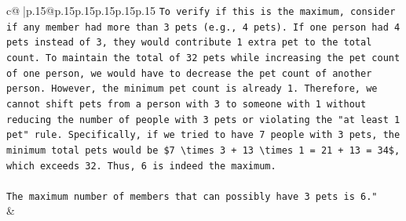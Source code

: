 \documentclass{article}
\begin{document}
{\begin{supertabular}{c@{$\;$}|p{.15\linewidth}@{}p{.15\linewidth}p{.15\linewidth}p{.15\linewidth}p{.15\linewidth}p{.15\linewidth}}
{{{\texttt{To verify if this is the maximum, consider if any member had more than 3 pets (e.g., 4 pets). If one person had 4 pets instead of 3, they would contribute 1 extra pet to the total count. To maintain the total of 32 pets while increasing the pet count of one person, we would have to decrease the pet count of another person. However, the minimum pet count is already 1. Therefore, we cannot shift pets from a person with 3 to someone with 1 without reducing the number of people with 3 pets or violating the "at least 1 pet" rule. Specifically, if we tried to have 7 people with 3 pets, the minimum total pets would be \$7 \textbackslash{}times 3 + 13 \textbackslash{}times 1 = 21 + 13 = 34\$, which exceeds 32. Thus, 6 is indeed the maximum.} \\
\\ 
\texttt{The maximum number of members that can possibly have 3 pets is 6."} \\
            }
        }
    }
    & \\ \\


\end{supertabular}}
\end{document}
